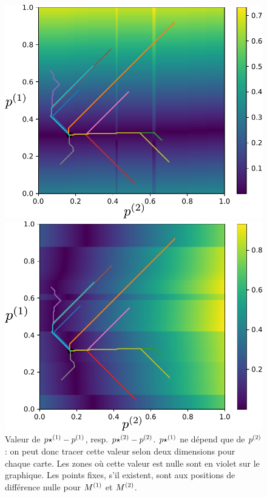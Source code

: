 \begin{figure}
\begin{minipage}{0.5\textwidth}
\centering
\includegraphics[width=\textwidth]{champ_X_006.pdf}
\end{minipage}
\begin{minipage}{0.5\textwidth}
\centering
\includegraphics[width=\textwidth]{champ_Y_006.pdf}
\end{minipage}
\caption{Valeur de ${p\star}^{({1})} - p^{({1})}$, resp. ${p\star}^{({2})} - p^{({2})}$. ${p\star}^{({1})}$ ne dépend que de $p^{({2})}$ : on peut donc tracer cette valeur selon deux dimensions pour chaque carte. Les zones où cette valeur est nulle sont en violet sur le graphique. Les points fixes, s'il existent, sont aux positions de différence nulle pour $M^{({1})}$ et $M^{({2})}$.}
\label{fig:diff_relax}
\end{figure}


